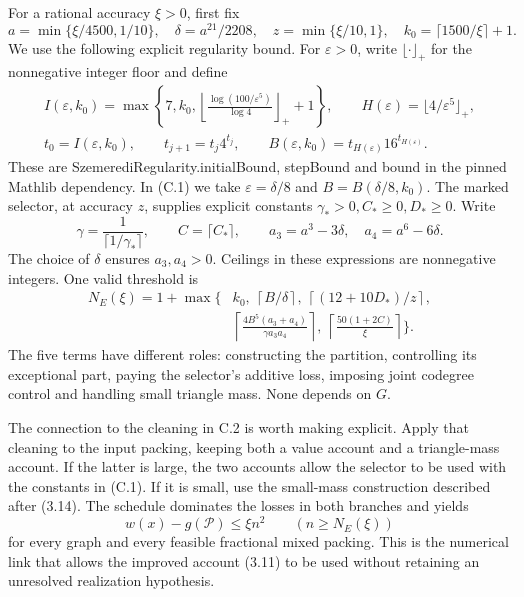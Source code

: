 \documentclass[english,11pt,a4paper]{article}
\begin{document}
For a rational accuracy \(\xi>0\), first fix \[
a=\min\{\xi/4500,1/10\},\quad
\delta=a^{21}/2208,\quad z=\min\{\xi/10,1\},\quad
k_0=\lceil1500/\xi\rceil+1.
\] We use the following explicit regularity bound. For \(\varepsilon>0\), write \(\lfloor\cdot\rfloor_+\) for the nonnegative integer floor and define \[
\begin{gathered}
I(\varepsilon,k_0)=\max\left\{7,k_0,
\left\lfloor\frac{\log(100/\varepsilon^5)}{\log4}\right\rfloor_++1\right\},
\qquad H(\varepsilon)=\lfloor4/\varepsilon^5\rfloor_+,\\
t_0=I(\varepsilon,k_0),\qquad t_{j+1}=t_j4^{t_j},\qquad
B(\varepsilon,k_0)=t_{H(\varepsilon)}16^{t_{H(\varepsilon)}}.
\end{gathered}
\] These are {\ttfamily\small SzemerediReg\discretionary{\hbox{\ensuremath{\hookrightarrow}}}{}{}ularity.\discretionary{\hbox{\ensuremath{\hookrightarrow}}}{}{}initialBound}, {\ttfamily\small stepBound} and {\ttfamily\small bound} in the pinned Mathlib dependency. In (C.1) we take \(\varepsilon=\delta/8\) and \(B=B(\delta/8,k_0)\). The marked selector, at accuracy \(z\), supplies explicit constants \(\gamma_*>0,C_*\ge0,D_*\ge0\). Write \[
\gamma=\frac1{\lceil1/\gamma_*\rceil},\qquad C=\lceil C_*\rceil,\qquad
a_3=a^3-3\delta,\quad a_4=a^6-6\delta.
\] The choice of \(\delta\) ensures \(a_3,a_4>0\). Ceilings in these expressions are nonnegative integers. One valid threshold is \[
\begin{split}
N_E(\xi)=1+\max\biggl\{&
k_0,\ \left\lceil B/\delta\right\rceil,\
\left\lceil(12+10D_*)/z\right\rceil,\\
&\left\lceil\frac{4B^5(a_3+a_4)}{\gamma a_3a_4}\right\rceil,\
\left\lceil\frac{50(1+2C)}{\xi}\right\rceil
\biggr\}.
\end{split}
\tag{C.1}
\] The five terms have different roles: constructing the partition, controlling its exceptional part, paying the selector's additive loss, imposing joint codegree control and handling small triangle mass. None depends on \(G\).

The connection to the cleaning in C.2 is worth making explicit. Apply that cleaning to the input packing, keeping both a value account and a triangle-mass account. If the latter is large, the two accounts allow the selector to be used with the constants in (C.1). If it is small, use the small-mass construction described after (3.14). The schedule dominates the losses in both branches and yields \[
w(x)-g(\mathcal P)\le\xi n^2
\qquad(n\ge N_E(\xi))
\tag{C.2}
\] for every graph and every feasible fractional mixed packing. This is the numerical link that allows the improved account (3.11) to be used without retaining an unresolved realization hypothesis.
\end{document}

